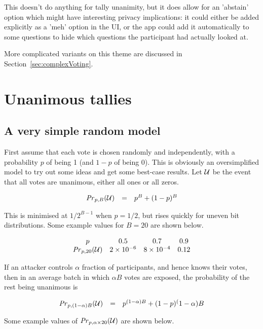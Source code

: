 \documentclass[10pt,a4paper]{article}
\begin{document}
This doesn't do anything for tally unanimity, but it does allow for an 'abstain' option which might have interesting privacy implications: it could either be added explicitly as a 'meh' option in the UI, or the app could add it automatically to some questions to hide which questions the participant had actually looked at.

More complicated variants on this theme are discussed in Section~\ref{sec:complexVoting}.

\section{Unanimous tallies}

\subsection{A very simple random model}
First assume that each vote is chosen randomly and independently, with a probability $p$ of being 1 (and $1-p$ of being 0). This is obviously an oversimplified model to try out some ideas and get some best-case results.
Let $\mathcal{U}$ be the event that all votes are unanimous, either all ones or all zeros.

$$
\begin{array}{rcl}
	\mathit{Pr}_{p,B}(\mathcal{U}) & = & p^{B} + (1-p)^B \\
\end{array}
$$

This is minimised at $1/2^{B-1}$ when $p=1/2$, but rises quickly for uneven bit distributions. Some example values for $B=20$ are shown below.

$$
\begin{array}{cccc}
p & 0.5 & 0.7 & 0.9 \\
\mathit{Pr}_{p,20}(\mathcal{U}) & 2 \times 10^{-6} & 8 \times 10^{-4} & 0.12
\end{array}
$$

If an attacker controls $\alpha$ fraction of participants, and hence knows their votes, then in an average batch in which $\alpha B$ votes are exposed, the probability of the rest being unanimous is

$$
\begin{array}{rcl}
\mathit{Pr}_{p,(1-\alpha)B}(\mathcal{U}) & = & p^{(1-\alpha)B} + (1-p)^(1-\alpha)B \\
\end{array}
$$

Some example values of $\mathit{Pr}_{p,\alpha \times 20}(\mathcal{U})$ are shown below.
\end{document}
